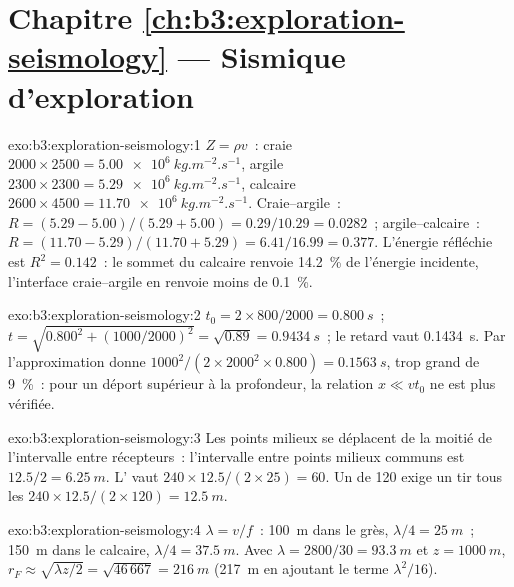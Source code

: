\section*{Chapitre \ref{ch:b3:exploration-seismology} --- Sismique d'exploration}

\begin{solution}{exo:b3:exploration-seismology:1}
$Z = \rho v$~: craie $2000\times2500 = \qty{5.00e6}{kg.m^{-2}.s^{-1}}$, argile
$2300\times2300 = \qty{5.29e6}{kg.m^{-2}.s^{-1}}$, calcaire $2600\times4500 =
\qty{11.70e6}{kg.m^{-2}.s^{-1}}$. Craie--argile~: $R = (5.29 - 5.00)/(5.29 + 5.00)
= 0.29/10.29 = 0.0282$~; argile--calcaire~: $R = (11.70 - 5.29)/(11.70 + 5.29) =
6.41/16.99 = 0.377$. L'énergie réfléchie est $R^2 = 0.142$~: le sommet du
calcaire renvoie \qty{14.2}{\percent} de l'énergie incidente, l'interface craie--argile
en renvoie moins de \qty{0.1}{\percent}.
\end{solution}

\begin{solution}{exo:b3:exploration-seismology:2}
$t_0 = 2\times800/2000 = \qty{0.800}{s}$~; $t = \sqrt{0.800^2 + (1000/2000)^2} =
\sqrt{0.89} = \qty{0.9434}{s}$~; le retard vaut \qty{0.1434}{s}. Par
l'approximation donne $1000^2/(2\times2000^2\times0.800) = \qty{0.1563}{s}$, trop
grand de \qty{9}{\percent}~: pour un déport supérieur à la profondeur, la relation $x \ll vt_0$ ne
est plus vérifiée.
\end{solution}

\begin{solution}{exo:b3:exploration-seismology:3}
Les points milieux se déplacent de la moitié de l'intervalle entre récepteurs~: l'intervalle entre points milieux communs est
$12.5/2 = \qty{6.25}{m}$. L' vaut $240\times12.5/(2\times25) = 60$. Un  de 120 exige un tir tous les $240\times12.5/(2\times120) = \qty{12.5}{m}$.
\end{solution}

\begin{solution}{exo:b3:exploration-seismology:4}
$\lambda = v/f$~: \qty{100}{m} dans le grès, $\lambda/4 = \qty{25}{m}$~;
\qty{150}{m} dans le calcaire, $\lambda/4 = \qty{37.5}{m}$. Avec
$\lambda = 2800/30 = \qty{93.3}{m}$ et $z = \qty{1000}{m}$,
$r_F \approx \sqrt{\lambda z/2} = \sqrt{46\,667} = \qty{216}{m}$ (\qty{217}{m}
en ajoutant le terme $\lambda^2/16$).
\end{solution}

